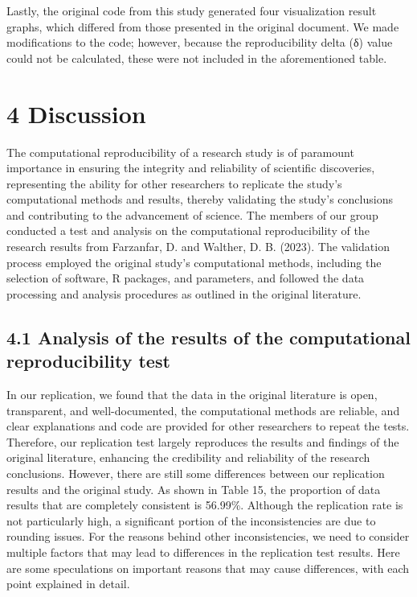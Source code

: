 \documentclass[
  man,floatsintext]{apa6}
\begin{document}
Lastly, the original code from this study generated four visualization result graphs, which differed from those presented in the original document. We made modifications to the code; however, because the reproducibility delta (δ) value could not be calculated, these were not included in the aforementioned table.

\section{4 Discussion}\label{discussion}

The computational reproducibility of a research study is of paramount importance in ensuring the integrity and reliability of scientific discoveries, representing the ability for other researchers to replicate the study's computational methods and results, thereby validating the study's conclusions and contributing to the advancement of science. The members of our group conducted a test and analysis on the computational reproducibility of the research results from Farzanfar, D. and Walther, D. B. (2023). The validation process employed the original study's computational methods, including the selection of software, R packages, and parameters, and followed the data processing and analysis procedures as outlined in the original literature.

\subsection{4.1 Analysis of the results of the computational reproducibility test}\label{analysis-of-the-results-of-the-computational-reproducibility-test}

In our replication, we found that the data in the original literature is open, transparent, and well-documented, the computational methods are reliable, and clear explanations and code are provided for other researchers to repeat the tests. Therefore, our replication test largely reproduces the results and findings of the original literature, enhancing the credibility and reliability of the research conclusions. However, there are still some differences between our replication results and the original study. As shown in Table 15, the proportion of data results that are completely consistent is 56.99\%. Although the replication rate is not particularly high, a significant portion of the inconsistencies are due to rounding issues. For the reasons behind other inconsistencies, we need to consider multiple factors that may lead to differences in the replication test results. Here are some speculations on important reasons that may cause differences, with each point explained in detail.
\end{document}
